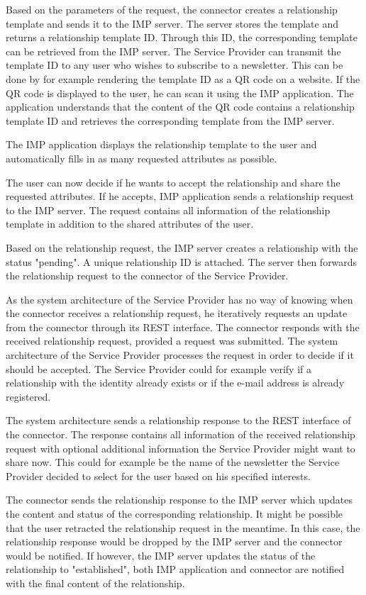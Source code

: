 Based on the parameters of the request, the connector creates a relationship template and sends it to the IMP server. The server stores the template and returns a relationship template ID. Through this ID, the corresponding template can be retrieved from the IMP server.
The Service Provider can transmit the template ID to any user who wishes to subscribe to a newsletter. This can be done by for example rendering the template ID as a QR code on a website.
If the QR code is displayed to the user, he can scan it using the IMP application. The application understands that the content of the QR code contains a relationship template ID and retrieves the corresponding template from the IMP server.

The IMP application displays the relationship template to the user and automatically fills in as many requested attributes as possible.

The user can now decide if he wants to accept the relationship and share the requested attributes. If he accepts, IMP application sends a relationship request to the IMP server. The request contains all information of the relationship template in addition to the shared attributes of the user.

Based on the relationship request, the IMP server creates a relationship with the status "pending". A unique relationship ID is attached. The server then forwards the relationship request to the connector of the Service Provider.

As the system architecture of the Service Provider has no way of knowing when the connector receives a relationship request, he iteratively requests an update from the connector through its REST interface. The connector responds with the received relationship request, provided a request was submitted. The system architecture of the Service Provider processes the request in order to decide if it should be accepted. The Service Provider could for example verify if a relationship with the identity already exists or if the e-mail address is already registered.

The system architecture sends a relationship response to the REST interface of the connector. The response contains all information of the received relationship request with optional additional information the Service Provider might want to share now. This could for example be the name of the newsletter the Service Provider decided to select for the user based on his specified interests.

The connector sends the relationship response to the IMP server which updates the content and status of the corresponding relationship. It might be possible that the user retracted the relationship request in the meantime. In this case, the relationship response would be dropped by the IMP server and the connector would be notified.
If however, the IMP server updates the status of the relationship to "established", both IMP application and connector are notified with the final content of the relationship.

